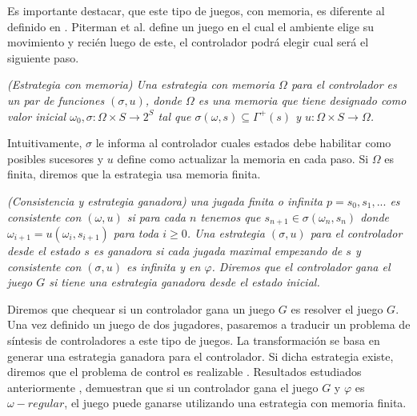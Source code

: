 Es importante destacar, que este tipo de juegos, con memoria, es diferente al definido en \cite{Piterman}. Piterman et al.
define un juego en el cual el ambiente elige su movimiento y recién luego de este, el controlador podrá elegir cual será
el siguiente paso.

\begin{nahaDef}
    \emph{(Estrategia con memoria) Una estrategia con memoria $\Omega$ para el controlador es un par de funciones
    $(\sigma, u)$, donde $\Omega$ es una memoria que tiene designado como valor inicial $\omega_0, \sigma: \Omega \times
    S \rightarrow 2^S$ tal que $\sigma(\omega,s) \subseteq \Gamma^+(s)$ y $u: \Omega \times S \rightarrow \Omega$.}
\end{nahaDef}

Intuitivamente, $\sigma$ le informa al controlador cuales estados debe habilitar como posibles sucesores y $u$ define
como actualizar la memoria en cada paso. Si $\Omega$ es finita, diremos que la estrategia usa memoria finita.

\begin{nahaDef}
    \emph{(Consistencia y estrategia ganadora) una jugada finita o infinita $p = s_0,s_1,...$ es consistente con
    $(\omega,u)$ si para cada $n$ tenemos que $s_{n+1} \in \sigma(\omega_n,s_n)$ donde $\omega_{i+1} =
    u(\omega_i,s_{i+1})$ para toda $i \geq 0$. Una estrategia $(\sigma, u)$ para el controlador desde el estado $s$ es
    ganadora si cada jugada maximal empezando de $s$ y consistente con $(\sigma, u)$ es infinita y en $\varphi$. Diremos
    que el controlador gana el juego $G$ si tiene una estrategia ganadora desde el estado inicial.}
\end{nahaDef}

Diremos que chequear si un controlador gana un juego $G$ es resolver el juego $G$. Una vez definido un juego de dos
jugadores, pasaremos a traducir un problema de síntesis de controladores a este tipo de juegos. La transformación se
basa en generar una estrategia ganadora para el controlador. Si dicha estrategia existe, diremos que el problema de
control es realizable \cite{MalerPS95,21072}. Resultados estudiados anteriormente \cite{Pnueli:1989:SRM:75277.75293},
demuestran que si un controlador gana el juego $G$ y $\varphi$ es $\omega -regular$, el juego puede ganarse utilizando
una estrategia con memoria finita.
